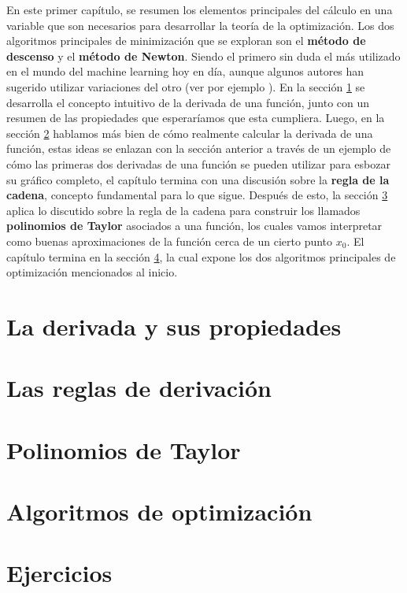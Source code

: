 En este primer capítulo, se resumen los elementos principales del cálculo en una variable que son necesarios para desarrollar la teoría de la optimización. Los dos algoritmos principales de minimización que se exploran son el \textbf{método de descenso} y el \textbf{método de Newton}. Siendo el primero sin duda el más utilizado en el mundo del machine learning hoy en día, aunque algunos autores han sugerido utilizar variaciones del otro (ver por ejemplo \cite{optimizacion-methods-for-dl}). En la sección \ref{svc:sec:derivada} se desarrolla el concepto intuitivo de la derivada de una función, junto con un resumen de las propiedades que esperaríamos que esta cumpliera. Luego, en la sección \ref{svc:sec:reglas} hablamos más bien de cómo realmente calcular la derivada de una función, estas ideas se enlazan con la sección anterior a través de un ejemplo de cómo las primeras dos derivadas de una función se pueden utilizar para esbozar su gráfico completo, el capítulo termina con una discusión sobre la \textbf{regla de la cadena}, concepto fundamental para lo que sigue. Después de esto, la sección \ref{svc:sec:taylor} aplica lo discutido sobre la regla de la cadena para construir los llamados \textbf{polinomios de Taylor} asociados a una función, los cuales vamos interpretar como buenas aproximaciones de la función cerca de un cierto punto $x_0$. El capítulo termina en la sección \ref{svc:sec:opti}, la cual expone los dos algoritmos principales de optimización mencionados al inicio.

\section{La derivada y sus propiedades} \label{svc:sec:derivada}

\section{Las reglas de derivación} \label{svc:sec:reglas}

\section{Polinomios de Taylor} \label{svc:sec:taylor}

\section{Algoritmos de optimización} \label{svc:sec:opti}

\section{Ejercicios}